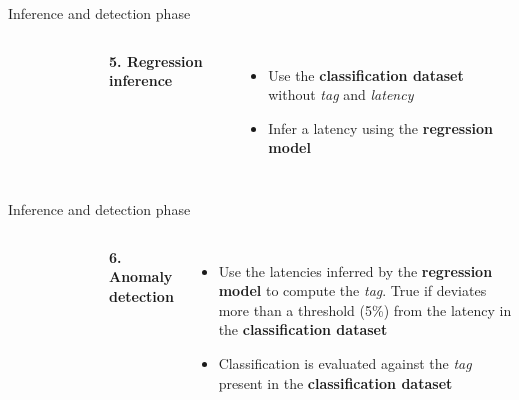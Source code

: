 \begin{frame}{Inference and detection phase}
    \begin{columns}
        \vspace{-1cm}
        \begin{figure}[!ht]
            \centering
            
        \end{figure}

        
        \textbf{\textcolor{omni-spring-pastels-9}{5. Regression inference}}
        \begin{itemize}
            \item Use the \textbf{classification dataset} without \textit{tag} and \textit{latency} 
            \item Infer a latency using the \textbf{regression model}
        \end{itemize}
    \end{columns}
\end{frame}

\begin{frame}{Inference and detection phase}
    \begin{columns}
        \vspace{-1cm}
        \begin{figure}[!ht]
            \centering
            
        \end{figure}

        
        \textbf{\textcolor{omni-spring-pastels-9}{6. Anomaly detection}}
        \begin{itemize}
            \item Use the latencies inferred by the \textbf{regression model} to compute the \textit{tag}. True if deviates more than a threshold (5\%) from the latency in the \textbf{classification dataset}
            \item Classification is evaluated against the \textit{tag} present in the \textbf{classification dataset}
        \end{itemize}
    \end{columns}
\end{frame}


